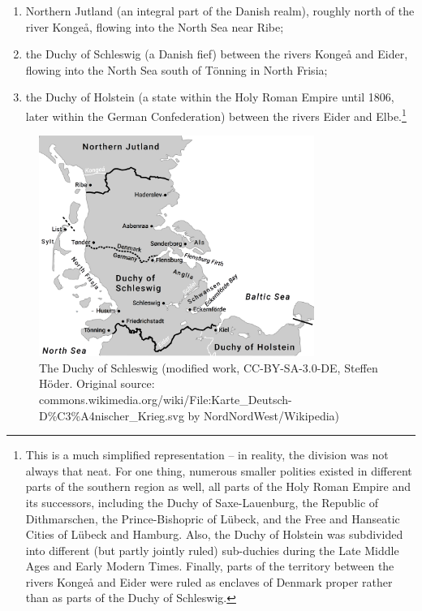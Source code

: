 \documentclass[output=paper]{langsci/langscibook}
\begin{document}
 \begin{enumerate}
	\item Northern Jutland (an integral part of the Danish realm), roughly north of the river Kongeå, flowing into the North Sea near Ribe;

	\item the Duchy of Schleswig (a Danish fief) between the rivers Kongeå and Eider, flowing into the North Sea south of Tönning in North Frisia;

 \item the Duchy of Holstein (a state within the Holy Roman Empire until 1806, later within the German Confederation) between the rivers Eider and Elbe.\footnote{This is a much simplified representation – in reality, the division was not always that neat. For one thing, numerous smaller polities existed in different parts of the southern region as well, all parts of the Holy Roman Empire and its successors, including the Duchy of Saxe-Lauenburg, the Republic of Dithmarschen, the Prince-Bishopric of Lübeck, and the Free and Hanseatic Cities of Lübeck and Hamburg. Also, the Duchy of Holstein was subdivided into different (but partly jointly ruled) sub-duchies during the Late Middle Ages and Early Modern Times. Finally, parts of the territory between the rivers Kongeå and Eider were ruled as enclaves of Denmark proper rather than as parts of the Duchy of Schleswig.}
	\end{enumerate}

\begin{figure}
\includegraphics[width=0.8\textwidth]{figures/hoeder-map.png}
\caption{The Duchy of Schleswig (modified work, CC-BY-SA-3.0-DE, Steffen Höder. Original source: commons.wikimedia.org/wiki/File:Karte\_Deutsch-D\%C3\%A4nischer\_Krieg.svg by NordNordWest/Wikipedia)}\label{fig:hoeder:1}
\end{figure}
\end{document}
